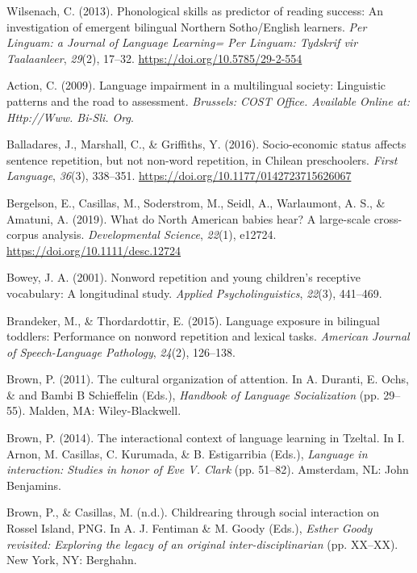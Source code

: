 \documentclass[english,,man,floatsintext]{apa6}
\begin{document}
\leavevmode\hypertarget{ref-wilsenach2013phonological}{}%
Wilsenach, C. (2013). Phonological skills as predictor of reading success: An investigation of emergent bilingual Northern Sotho/English learners. \emph{Per Linguam: a Journal of Language Learning= Per Linguam: Tydskrif vir Taalaanleer}, \emph{29}(2), 17--32. \url{https://doi.org/10.5785/29-2-554}

\leavevmode\hypertarget{ref-is08042009language}{}%
Action, C. (2009). Language impairment in a multilingual society: Linguistic patterns and the road to assessment. \emph{Brussels: COST Office. Available Online at: Http://Www. Bi-Sli. Org}.

\leavevmode\hypertarget{ref-balladares2016socio}{}%
Balladares, J., Marshall, C., \& Griffiths, Y. (2016). Socio-economic status affects sentence repetition, but not non-word repetition, in Chilean preschoolers. \emph{First Language}, \emph{36}(3), 338--351. \url{https://doi.org/10.1177/0142723715626067}

\leavevmode\hypertarget{ref-bergelsoncasillas2019what}{}%
Bergelson, E., Casillas, M., Soderstrom, M., Seidl, A., Warlaumont, A. S., \& Amatuni, A. (2019). What do North American babies hear? A large-scale cross-corpus analysis. \emph{Developmental Science}, \emph{22}(1), e12724. \url{https://doi.org/10.1111/desc.12724}

\leavevmode\hypertarget{ref-bowey2001nonword}{}%
Bowey, J. A. (2001). Nonword repetition and young children's receptive vocabulary: A longitudinal study. \emph{Applied Psycholinguistics}, \emph{22}(3), 441--469.

\leavevmode\hypertarget{ref-brandeker2015language}{}%
Brandeker, M., \& Thordardottir, E. (2015). Language exposure in bilingual toddlers: Performance on nonword repetition and lexical tasks. \emph{American Journal of Speech-Language Pathology}, \emph{24}(2), 126--138.

\leavevmode\hypertarget{ref-brown2011cultural}{}%
Brown, P. (2011). The cultural organization of attention. In A. Duranti, E. Ochs, \& and Bambi B Schieffelin (Eds.), \emph{Handbook of Language Socialization} (pp. 29--55). Malden, MA: Wiley-Blackwell.

\leavevmode\hypertarget{ref-brown2014interactional}{}%
Brown, P. (2014). The interactional context of language learning in Tzeltal. In I. Arnon, M. Casillas, C. Kurumada, \& B. Estigarribia (Eds.), \emph{Language in interaction: Studies in honor of Eve V. Clark} (pp. 51--82). Amsterdam, NL: John Benjamins.

\leavevmode\hypertarget{ref-brownIPchildrearing}{}%
Brown, P., \& Casillas, M. (n.d.). Childrearing through social interaction on Rossel Island, PNG. In A. J. Fentiman \& M. Goody (Eds.), \emph{Esther Goody revisited: Exploring the legacy of an original inter-disciplinarian} (pp. XX--XX). New York, NY: Berghahn.
\end{document}
